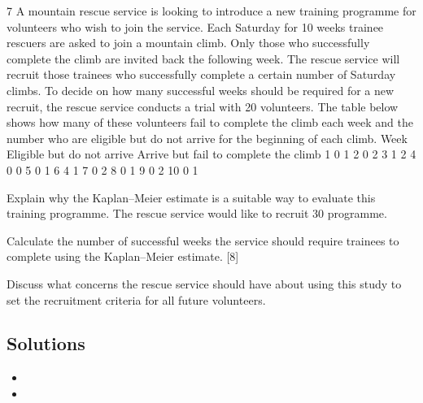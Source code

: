 7 A mountain rescue service is looking to introduce a new training programme for
volunteers who wish to join the service. Each Saturday for 10 weeks trainee rescuers
are asked to join a mountain climb. Only those who successfully complete the climb
are invited back the following week.
The rescue service will recruit those trainees who successfully complete a certain
number of Saturday climbs. To decide on how many successful weeks should be
required for a new recruit, the rescue service conducts a trial with 20 volunteers. The
table below shows how many of these volunteers fail to complete the climb each week
and the number who are eligible but do not arrive for the beginning of each climb.
Week Eligible but do
not arrive
Arrive but fail to
complete the climb
1 0 1
2 0 2
3 1 2
4 0 0
5 0 1
6 4 1
7 0 2
8 0 1
9 0 2
10 0 1
\item   Explain why the Kaplan–Meier estimate is a suitable way to evaluate this
training programme. 
The rescue service would like to recruit 30%
programme.
\item   Calculate the number of successful weeks the service should require trainees
to complete using the Kaplan–Meier estimate. [8]
\item  Discuss what concerns the rescue service should have about using this study to
set the recruitment criteria for all future volunteers. 

\subsection*{Solutions}

\begin{itemize}
\item
\item
\end{itemize}


